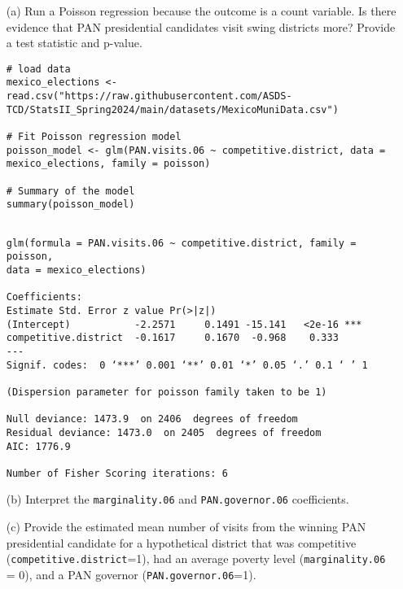 \documentclass[12pt,letterpaper]{article}
\begin{document}
\begin{enumerate}
	\item [(a)]
	Run a Poisson regression because the outcome is a count variable. Is there evidence that PAN presidential candidates visit swing districts more? Provide a test statistic and p-value.

\begin{lstlisting}	
# load data
mexico_elections <- read.csv("https://raw.githubusercontent.com/ASDS-TCD/StatsII_Spring2024/main/datasets/MexicoMuniData.csv")

# Fit Poisson regression model
poisson_model <- glm(PAN.visits.06 ~ competitive.district, data = mexico_elections, family = poisson)

# Summary of the model
summary(poisson_model)

\end{lstlisting}

\begin{verbatim}

glm(formula = PAN.visits.06 ~ competitive.district, family = poisson, 
data = mexico_elections)

Coefficients:
Estimate Std. Error z value Pr(>|z|)    
(Intercept)           -2.2571     0.1491 -15.141   <2e-16 ***
competitive.district  -0.1617     0.1670  -0.968    0.333    
---
Signif. codes:  0 ‘***’ 0.001 ‘**’ 0.01 ‘*’ 0.05 ‘.’ 0.1 ‘ ’ 1

(Dispersion parameter for poisson family taken to be 1)

Null deviance: 1473.9  on 2406  degrees of freedom
Residual deviance: 1473.0  on 2405  degrees of freedom
AIC: 1776.9

Number of Fisher Scoring iterations: 6

\end{verbatim}

	\item [(b)]
	Interpret the \texttt{marginality.06} and \texttt{PAN.governor.06} coefficients.
	
	\item [(c)]
	Provide the estimated mean number of visits from the winning PAN presidential candidate for a hypothetical district that was competitive (\texttt{competitive.district}=1), had an average poverty level (\texttt{marginality.06} = 0), and a PAN governor (\texttt{PAN.governor.06}=1).
	
\end{enumerate}
\end{document}
